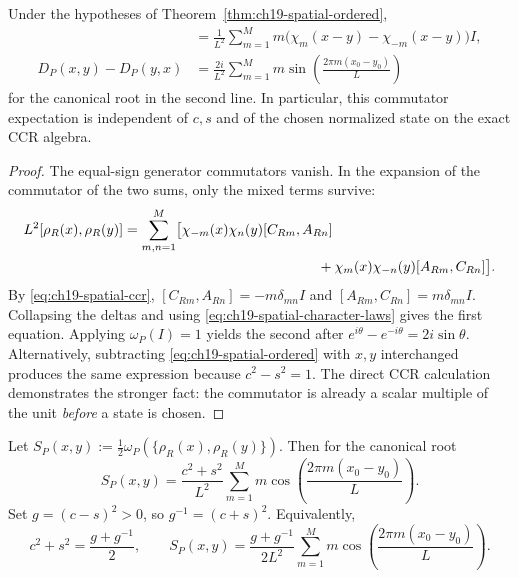 \begin{proposition}
\label{prop:ch19-spatial-commutator}
Under the hypotheses of Theorem~\ref{thm:ch19-spatial-ordered},
\begin{align}
 [\rho_R(x),\rho_R(y)]
 &=\frac1{L^2}\sum_{m=1}^{M}m
   \bigl(\chi_m(x-y)-\chi_{-m}(x-y)\bigr)I,
 \label{eq:ch19-spatial-commutator}\\
 D_P(x,y)-D_P(y,x)
 &=\frac{2i}{L^2}\sum_{m=1}^{M}m
   \sin\!\left(\frac{2\pi m(x_0-y_0)}L\right)
 \label{eq:ch19-spatial-commutator-sine}
\end{align}
for the canonical root in the second line.  In particular, this
commutator expectation is independent of $c,s$ and of the chosen
normalized state on the exact CCR algebra.
\end{proposition}

\begin{proof}
The equal-sign generator commutators vanish.  In the expansion of
the commutator of the two sums, only the mixed terms survive:
\begin{align*}
 L^2[\rho_R(x),\rho_R(y)]
 &=\sum_{m,n=1}^{M}\bigl[
  \chi_{-m}(x)\chi_n(y)[C_{Rm},A_{Rn}]\\
 &\hspace{49mm}+
  \chi_m(x)\chi_{-n}(y)[A_{Rm},C_{Rn}]\bigr].
\end{align*}
By \eqref{eq:ch19-spatial-ccr},
$[C_{Rm},A_{Rn}]=-m\delta_{mn}I$ and
$[A_{Rm},C_{Rn}]=m\delta_{mn}I$.  Collapsing the deltas and using
\eqref{eq:ch19-spatial-character-laws} gives the first equation.
Applying $\omega_P(I)=1$ yields the second after
$e^{i\theta}-e^{-i\theta}=2i\sin\theta$.
Alternatively, subtracting \eqref{eq:ch19-spatial-ordered} with
$x,y$ interchanged produces the same expression because
$c^2-s^2=1$.  The direct CCR calculation demonstrates the stronger
fact: the commutator is already a scalar multiple of the unit
\emph{before} a state is chosen.
\end{proof}

\begin{proposition}
\label{prop:ch19-spatial-symmetrized}
Let
$S_P(x,y):=\tfrac12\omega_P(\{\rho_R(x),\rho_R(y)\})$.
Then for the canonical root
\begin{equation}
 \boxed{\displaystyle
 S_P(x,y)=\frac{c^2+s^2}{L^2}
 \sum_{m=1}^{M}m\cos\!\left(\frac{2\pi m(x_0-y_0)}L\right).}
 \label{eq:ch19-spatial-symmetrized}
\end{equation}
Set $g=(c-s)^2>0$, so $g^{-1}=(c+s)^2$.  Equivalently,
\begin{equation}
 c^2+s^2=\frac{g+g^{-1}}2,
 \qquad
 S_P(x,y)=\frac{g+g^{-1}}{2L^2}
 \sum_{m=1}^{M}m\cos\!\left(\frac{2\pi m(x_0-y_0)}L\right).
 \label{eq:ch19-spatial-symmetrized-g}
\end{equation}
\end{proposition}


